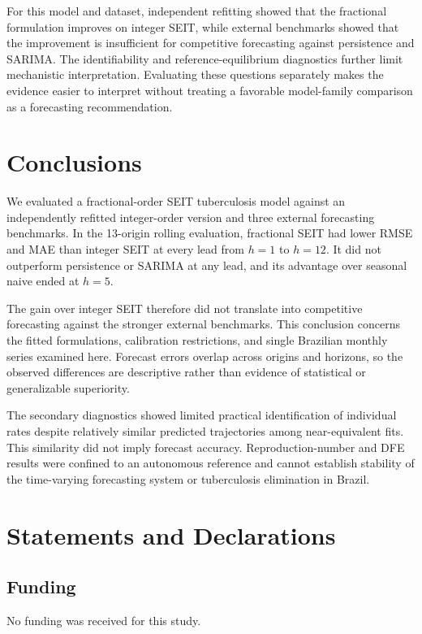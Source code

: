 \documentclass[pdflatex,sn-mathphys-ay]{sn-jnl}
\begin{document}
For this model and dataset, independent refitting showed that the fractional formulation improves on integer SEIT, while external benchmarks showed that the improvement is insufficient for competitive forecasting against persistence and SARIMA. The identifiability and reference-equilibrium diagnostics further limit mechanistic interpretation. Evaluating these questions separately makes the evidence easier to interpret without treating a favorable model-family comparison as a forecasting recommendation.

\section{Conclusions}

We evaluated a fractional-order SEIT tuberculosis model against an independently refitted integer-order version and three external forecasting benchmarks. In the 13-origin rolling evaluation, fractional SEIT had lower RMSE and MAE than integer SEIT at every lead from $h=1$ to $h=12$. It did not outperform persistence or SARIMA at any lead, and its advantage over seasonal naive ended at $h=5$.

The gain over integer SEIT therefore did not translate into competitive forecasting against the stronger external benchmarks. This conclusion concerns the fitted formulations, calibration restrictions, and single Brazilian monthly series examined here. Forecast errors overlap across origins and horizons, so the observed differences are descriptive rather than evidence of statistical or generalizable superiority.

The secondary diagnostics showed limited practical identification of individual rates despite relatively similar predicted trajectories among near-equivalent fits. This similarity did not imply forecast accuracy. Reproduction-number and DFE results were confined to an autonomous reference and cannot establish stability of the time-varying forecasting system or tuberculosis elimination in Brazil.

\section{Statements and Declarations}

\subsection{Funding}

No funding was received for this study.
\end{document}
